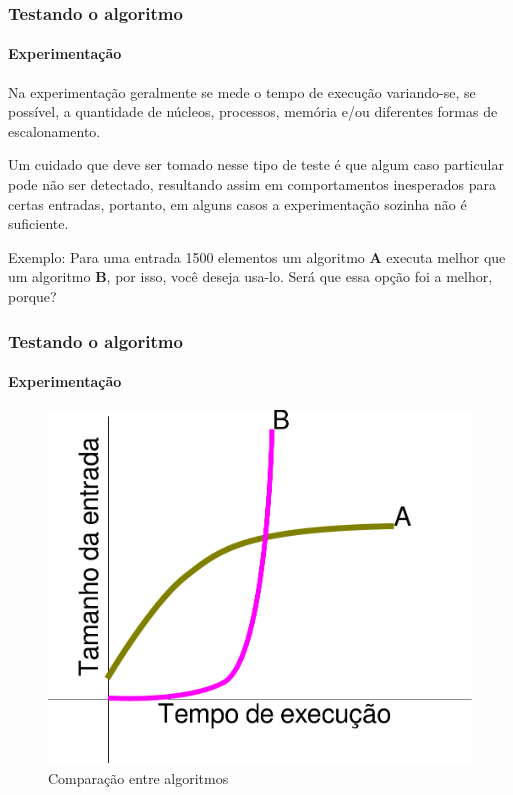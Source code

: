 \begin{frame}
	\frametitle{Testando o algoritmo}
	\framesubtitle{Experimentação}
	\par Na experimentação geralmente se mede o tempo de execução variando-se, se possível, a quantidade de núcleos, processos, memória e/ou diferentes formas de escalonamento.\newline
	
	\par Um cuidado que deve ser tomado nesse tipo de teste é que algum caso particular pode não ser detectado, resultando assim em comportamentos inesperados para certas entradas, portanto, em alguns casos a experimentação sozinha não é suficiente.\newline
	
	\par Exemplo: Para uma entrada 1500 elementos um algoritmo \textbf{A} executa melhor que um algoritmo \textbf{B}, por isso, você deseja usa-lo. Será que essa opção foi a melhor, porque? 
\end{frame}

\begin{frame}
	\frametitle{Testando o algoritmo}
	\framesubtitle{Experimentação}
	\begin{figure}
		\centering
		\includegraphics[width=0.5\linewidth]{images/graficoAlgoAeB}
		\caption{Comparação entre algoritmos}
		\label{fig:graficoalgoaeb}
	\end{figure}
	 
\end{frame}



